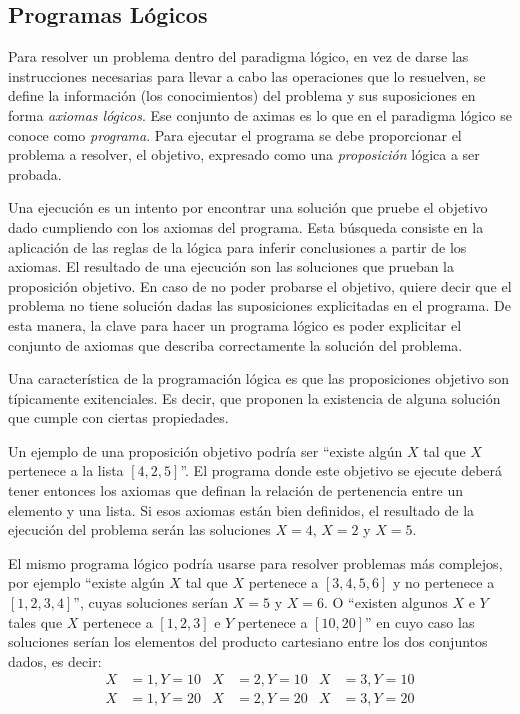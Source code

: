 \documentclass[12pt,titlepage]{article}
\begin{document}
\subsection{Programas Lógicos}
\label{sec:programaslogicos}

Para resolver un problema dentro del paradigma lógico, en vez de darse las instrucciones necesarias para llevar a cabo las operaciones que lo resuelven, se define la información (los conocimientos) del problema y sus suposiciones en forma \emph{axiomas lógicos}. Ese conjunto de aximas es lo que en el paradigma lógico se conoce como \emph{programa}. Para ejecutar el programa se debe proporcionar el problema a resolver, el objetivo, expresado como una \emph{proposición} lógica a ser probada. 

Una ejecución es un intento por encontrar una solución que pruebe el objetivo dado cumpliendo con los axiomas del programa. Esta búsqueda consiste en la aplicación de las reglas de la lógica para inferir conclusiones a partir de los axiomas. El resultado de una ejecución son las soluciones que prueban la proposición objetivo. En caso de no poder probarse el objetivo, quiere decir que el problema no tiene solución dadas las suposiciones explicitadas en el programa. De esta manera, la clave para hacer un programa lógico es poder explicitar el conjunto de axiomas que describa correctamente la solución del problema.

Una característica de la programación lógica es que las proposiciones objetivo son típicamente exitenciales. Es decir, que proponen la existencia de alguna solución que cumple con ciertas propiedades. 

Un ejemplo de una proposición objetivo podría ser ``existe algún $X$ tal que $X$ pertenece a la lista $[4,2,5]$''. El programa donde este objetivo se ejecute deberá tener entonces los axiomas que definan la relación de pertenencia entre un elemento y una lista. Si esos axiomas están bien definidos, el resultado de la ejecución del problema serán las soluciones $X=4$, $X=2$ y $X=5$.

El mismo programa lógico podría usarse para resolver problemas más complejos, por ejemplo ``existe algún $X$ tal que $X$ pertenece a $[3,4,5,6]$ y no pertenece a $[1,2,3,4]$'', cuyas soluciones serían $X=5$ y $X=6$. O ``existen algunos $X$ e $Y$ tales que $X$ pertenece a $[1,2,3]$ e $Y$ pertenece a $[10,20]$'' en cuyo caso las soluciones serían los elementos del producto cartesiano entre los dos conjuntos dados, es decir:
\begin{align*}
X& =1,Y=10& X& =2,Y=10& X& =3,Y=10 \\
X& =1,Y=20& X& =2,Y=20& X& =3,Y=20
\end{align*}
\end{document}
